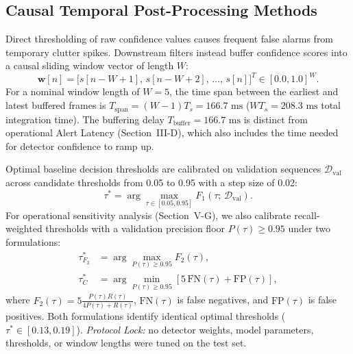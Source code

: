 \documentclass[conference]{IEEEtran}
\begin{document}
\subsection{Causal Temporal Post-Processing Methods}
Direct thresholding of raw confidence values causes frequent false alarms from temporary clutter spikes. Downstream filters instead buffer confidence scores into a causal sliding window vector of length $W$:
\begin{equation}
\mathbf{w}[n] = \big[s[n-W+1], \, s[n-W+2], \, \dots, \, s[n]\big]^T \in [0.0, 1.0]^W.
\label{eq:window_vector}
\end{equation}
For a nominal window length of $W = 5$, the time span between the earliest and latest buffered frames is $T_{\text{span}} = (W-1)T_s = 166.7\text{ ms}$ ($W T_s = 208.3\text{ ms}$ total integration time). The buffering delay $T_{\text{buffer}} = 166.7\text{ ms}$ is distinct from operational Alert Latency (Section~III-D), which also includes the time needed for detector confidence to ramp up.

Optimal baseline decision thresholds are calibrated on validation sequences $\mathcal{D}_{\text{val}}$ across candidate thresholds from 0.05 to 0.95 with a step size of 0.02:
\begin{equation}
\tau^* = \arg\max_{\tau \in [0.05, 0.95]} F_1(\tau; \, \mathcal{D}_{\text{val}}).
\label{eq:f1_opt}
\end{equation}
For operational sensitivity analysis (Section~V-G), we also calibrate recall-weighted thresholds with a validation precision floor $P(\tau) \ge 0.95$ under two formulations:
\begin{equation}
\begin{aligned}
\tau^*_{F_2} &= \arg\max_{P(\tau) \ge 0.95} F_2(\tau), \\
\tau^*_{C}   &= \arg\min_{P(\tau) \ge 0.95} [5\,\text{FN}(\tau) + \text{FP}(\tau)],
\end{aligned}
\label{eq:fbeta}
\end{equation}
where $F_2(\tau) = 5\frac{P(\tau)R(\tau)}{4 P(\tau) + R(\tau)}$, $\text{FN}(\tau)$ is false negatives, and $\text{FP}(\tau)$ is false positives. Both formulations identify identical optimal thresholds ($\tau^* \in [0.13, 0.19]$). \textit{Protocol Lock:} no detector weights, model parameters, thresholds, or window lengths were tuned on the test set.
\end{document}

